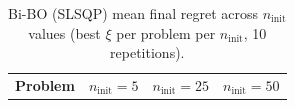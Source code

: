 \documentclass[12pt,a4paper]{article}%
\theoremstyle{plain}%
\theoremstyle{remark}%
\theoremstyle{definition}%
\providecommand{\DIFaddbegin}{} %
\providecommand{\DIFdelbegin}{} %
\providecommand{\DIFdelend}{} %
\newcommand{\DIFscaledelfig}{0.5}
\newlength{\DIFdelgraphicswidth} %
\newlength{\DIFdelgraphicsheight} %
\newcommand{\DIFaddincludegraphics}[2][]{{\color{blue}\fbox{\DIFOincludegraphics[#1]{#2}}}} %
\newcommand{\DIFdelincludegraphics}[2][]{%
\sbox{\DIFdelgraphicsbox}{\DIFOincludegraphics[#1]{#2}}%
\settoboxwidth{\DIFdelgraphicswidth}{\DIFdelgraphicsbox} %
\settoboxtotalheight{\DIFdelgraphicsheight}{\DIFdelgraphicsbox} %
\scalebox{\DIFscaledelfig}{%
\parbox[b]{\DIFdelgraphicswidth}{\usebox{\DIFdelgraphicsbox}\\[-\baselineskip] \rule{\DIFdelgraphicswidth}{0em}}\llap{\resizebox{\DIFdelgraphicswidth}{\DIFdelgraphicsheight}{%
\setlength{\unitlength}{\DIFdelgraphicswidth}%
\begin{picture}(1,1)%
\thicklines\linethickness{2pt} %
{\color[rgb]{1,0,0}\put(0,0){\framebox(1,1){}}}%
{\color[rgb]{1,0,0}\put(0,0){\line( 1,1){1}}}%
{\color[rgb]{1,0,0}\put(0,1){\line(1,-1){1}}}%
\end{picture}%
}\hspace*{3pt}}} %
} %
\DeclareRobustCommand{\DIFaddbegin}{\DIFOaddbegin \let\includegraphics\DIFaddincludegraphics} %
\DeclareRobustCommand{\DIFdelbegin}{\DIFOdelbegin \let\includegraphics\DIFdelincludegraphics} %
\DeclareRobustCommand{\DIFdelend}{\DIFOaddend \let\includegraphics\DIFOincludegraphics} %
\begin{document}
\begin{appendices}
\DIFdelbegin %
\DIFdelend \DIFaddbegin \begin{table}[htbp]
\centering
\caption{Bi-BO (SLSQP) mean final regret across $n_\text{init}$ values (best $\xi$ per problem per $n_\text{init}$, 10 repetitions).}
\label{tab:ninit_sensitivity}
\begin{tabular}{@{}lrrr@{}}
\toprule
\textbf{Problem} & $n_\text{init}=5$ & $n_\text{init}=25$ & $n_\text{init}=50$ \\

\end{tabular}
\end{table}
\end{appendices}
\end{document}
